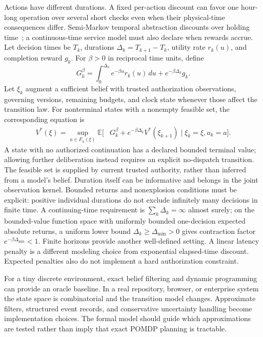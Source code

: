 Actions have different durations. A fixed per-action discount can favor one hour-long operation over several short checks even when their physical-time consequences differ. Semi-Markov temporal abstraction discounts over holding time~\cite{ch02_options1999}; a continuous-time service model must also declare when rewards accrue. Let decision times be $T_k$, durations $\Delta_k=T_{k+1}-T_k$, utility rate $r_k(u)$, and completion reward $g_k$. For $\beta>0$ in reciprocal time units, define
\begin{equation}
 G_k^\beta=\int_0^{\Delta_k}e^{-\beta u}r_k(u)\,du
          +e^{-\beta\Delta_k}g_k.
\end{equation}
Let $\xi_k$ augment a sufficient belief with trusted authorization observations, governing versions, remaining budgets, and clock state whenever those affect the transition law. For nonterminal states with a nonempty feasible set, the corresponding equation is
\begin{equation}
\begin{aligned}
 V^*(\xi)=\sup_{a\in F_\alpha(\xi)}
 \mathbb E[&G_k^\beta+e^{-\beta\Delta_k}V^*(\xi_{k+1})
 \mid \xi_k=\xi,a_k=a].
\end{aligned}
\end{equation}
A state with no authorized continuation has a declared bounded terminal value; allowing further deliberation instead requires an explicit no-dispatch transition. The feasible set is supplied by current trusted authority, rather than inferred from a model's belief. Duration itself can be informative and belongs in the joint observation kernel. Bounded returns and nonexplosion conditions must be explicit: positive individual durations do not exclude infinitely many decisions in finite time. A continuing-time requirement is $\sum_k\Delta_k=\infty$ almost surely; on the bounded-value function space with uniformly bounded one-decision expected absolute returns, a uniform lower bound $\Delta_k\geq\Delta_{\min}>0$ gives contraction factor $e^{-\beta\Delta_{\min}}<1$. Finite horizons provide another well-defined setting. A linear latency penalty is a different modeling choice from exponential elapsed-time discount. Expected penalties also do not implement a hard authorization constraint.

For a tiny discrete environment, exact belief filtering and dynamic programming can provide an oracle baseline. In a real repository, browser, or enterprise system the state space is combinatorial and the transition model changes. Approximate filters, structured event records, and conservative uncertainty handling become implementation choices. The formal model should guide which approximations are tested rather than imply that exact POMDP planning is tractable.


